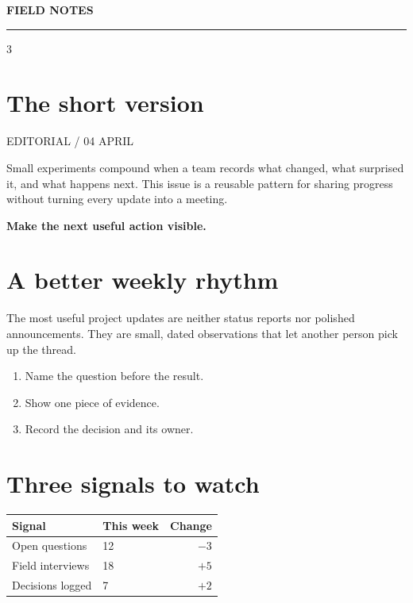 \documentclass[10pt]{article}
\newcommand{\dateline}[1]{\small\sffamily\color{muted}#1\par\medskip}
\newcommand{\pullquote}[1]{\begin{dispatch}\sffamily\large\bfseries\color{ink}#1\end{dispatch}}
\begin{document}
\begin{center}
  {\sffamily\fontsize{30}{32}\selectfont\bfseries\color{ink} FIELD NOTES}\par
  \par
\end{center}
\vspace{-4pt}\hrule\vspace{10pt}

\begin{multicols*}{3}
\section*{The short version}
\dateline{EDITORIAL / 04 APRIL}
Small experiments compound when a team records what changed, what surprised it, and what happens next. This issue is a reusable pattern for sharing progress without turning every update into a meeting.

\pullquote{Make the next useful action visible.}

\section*{A better weekly rhythm}
The most useful project updates are neither status reports nor polished announcements. They are small, dated observations that let another person pick up the thread.

\begin{enumerate}
  \item Name the question before the result.
  \item Show one piece of evidence.
  \item Record the decision and its owner.
\end{enumerate}

\section*{Three signals to watch}
\begin{tabular}{@{}llr@{}}
\toprule
Signal & This week & Change\\
\midrule
Open questions & 12 & $-3$\\
Field interviews & 18 & $+5$\\
Decisions logged & 7 & $+2$\\
\bottomrule
\end{tabular}


\end{multicols*}
\end{document}
